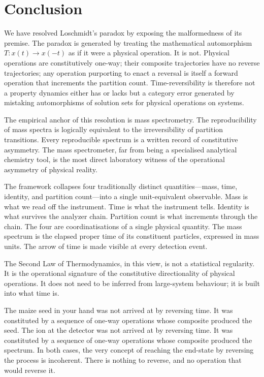 \documentclass[twocolumn,10pt,a4paper]{article}
\theoremstyle{definition}
\theoremstyle{remark}
\begin{document}
\section{Conclusion}
\label{sec:conclusion}

We have resolved Loschmidt's paradox by exposing the malformedness of its premise. The paradox is generated by treating the mathematical automorphism $T: x(t) \to x(-t)$ as if it were a physical operation. It is not. Physical operations are constitutively one-way; their composite trajectories have no reverse trajectories; any operation purporting to enact a reversal is itself a forward operation that increments the partition count. Time-reversibility is therefore not a property dynamics either has or lacks but a category error generated by mistaking automorphisms of solution sets for physical operations on systems.

The empirical anchor of this resolution is mass spectrometry. The reproducibility of mass spectra is logically equivalent to the irreversibility of partition transitions. Every reproducible spectrum is a written record of constitutive asymmetry. The mass spectrometer, far from being a specialised analytical chemistry tool, is the most direct laboratory witness of the operational asymmetry of physical reality.

The framework collapses four traditionally distinct quantities---mass, time, identity, and partition count---into a single unit-equivalent observable. Mass is what we read off the instrument. Time is what the instrument tells. Identity is what survives the analyzer chain. Partition count is what increments through the chain. The four are coordinatisations of a single physical quantity. The mass spectrum is the elapsed proper time of its constituent particles, expressed in mass units. The arrow of time is made visible at every detection event.

The Second Law of Thermodynamics, in this view, is not a statistical regularity. It is the operational signature of the constitutive directionality of physical operations. It does not need to be inferred from large-system behaviour; it is built into what time is.

The maize seed in your hand was not arrived at by reversing time. It was constituted by a sequence of one-way operations whose composite produced the seed. The ion at the detector was not arrived at by reversing time. It was constituted by a sequence of one-way operations whose composite produced the spectrum. In both cases, the very concept of reaching the end-state by reversing the process is incoherent. There is nothing to reverse, and no operation that would reverse it.
\end{document}
